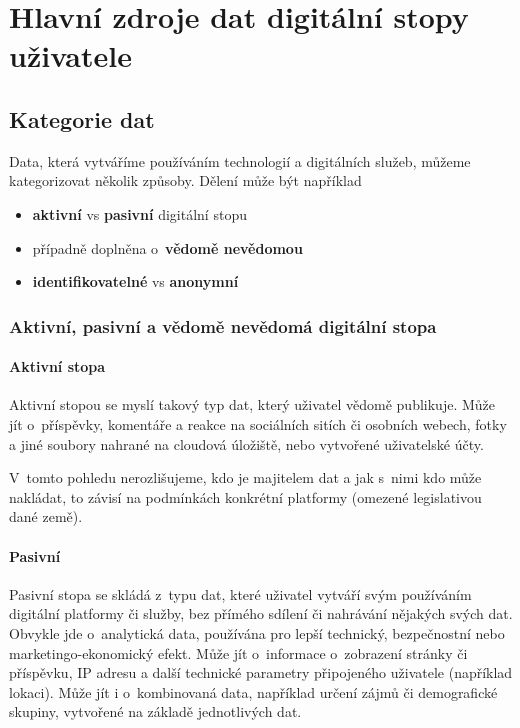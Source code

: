 \chapter{Hlavní zdroje dat digitální stopy uživatele}

\section{Kategorie dat}
Data, která vytváříme používáním technologií a digitálních služeb, můžeme kategorizovat několik způsoby. Dělení může být například
\begin{itemize}
	\item \textbf{aktivní} vs \textbf{pasivní} digitální stopu \citep{pew-digital-footprint}
    \item případně doplněna o~\textbf{vědomě nevědomou} \citep{fish-digital-footprint}
\item \textbf{identifikovatelné} vs \textbf{anonymní}
\end{itemize}


\subsection{Aktivní, pasivní a vědomě nevědomá digitální stopa}
\subsubsection{Aktivní stopa}
Aktivní stopou se myslí takový typ dat, který uživatel vědomě publikuje. Může jít o~příspěvky, komentáře a reakce na sociálních sitích či osobních webech, fotky a jiné soubory nahrané na cloudová úložiště, nebo vytvořené uživatelské účty.\citep{pew-digital-footprint}

V~tomto pohledu nerozlišujeme, kdo je majitelem dat a jak s~nimi kdo může nakládat, to závisí na podmínkách konkrétní platformy (omezené legislativou dané země).

\subsubsection{Pasivní}

Pasivní stopa se skládá z~typu dat, které uživatel vytváří svým používáním digitální platformy či služby, bez přímého sdílení či nahrávání nějakých svých dat. Obvykle jde o~analytická data, používána pro lepší technický, bezpečnostní nebo marketingo-ekonomický efekt. Může jít o~informace o~zobrazení stránky či příspěvku, IP adresu a další technické parametry připojeného uživatele (například lokaci). Může jít i o~kombinovaná data, například určení zájmů či demografické skupiny, vytvořené na základě jednotlivých dat.


